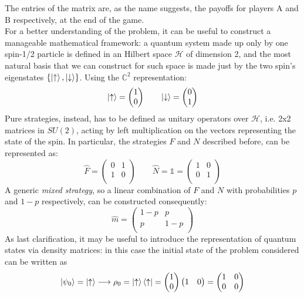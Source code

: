 The entries of the matrix are, as the name suggests, the payoffs for players A and B respectively, at the end of the game.\\
For a better understanding of the problem, it can be useful to construct a manageable mathematical framework: a quantum system made up only by one spin-1/2 particle is defined in an Hilbert space $\mathcal{H}$ of dimension 2, and the most natural basis that we can construct for such space is made just by the two spin's eigenstates $\{\ket{\uparrow}, \ket{\downarrow}\}$. Using the $\mathds{C}^2$ representation:
\[ \ket{\uparrow} = \begin{pmatrix} 1\\0\\ \end{pmatrix} \qquad \ket{\downarrow} = \begin{pmatrix} 0\\1\\ \end{pmatrix} \]
Pure strategies, instead, has to be defined as unitary operators over $\mathcal{H}$, i.e. 2x2 matrices in $SU(2)$, acting by left multiplication on the vectors representing the state of the spin. In particular, the strategies $F$ and $N$ described before, can be represented as:
\[ \hat{F} = \begin{pmatrix} 0&1\\1&0\\ \end{pmatrix} \qquad \hat{N} = \mathds{1} = \begin{pmatrix} 1&0\\0&1\\ \end{pmatrix} \]
A generic \textit{mixed strategy}, so a linear combination of $F$ and $N$ with probabilities $p$ and $1-p$ respectively, can be constructed consequently:
\[ \hat{m} = \begin{pmatrix} 1-p & p\\ p&1-p\\ \end{pmatrix} \]
As last clarification, it may be useful to introduce the representation of quantum states via density matrices: in this case
the initial state of the problem considered can be written as
\[ \ket{\psi_0}=\ket{\uparrow} \longrightarrow \rho_0 = \ket{\uparrow}\bra{\uparrow} = \begin{pmatrix} 1\\0\\ \end{pmatrix}\begin{pmatrix} 1&0\\ \end{pmatrix} = \begin{pmatrix} 1&0\\0&0\\ \end{pmatrix} \]
